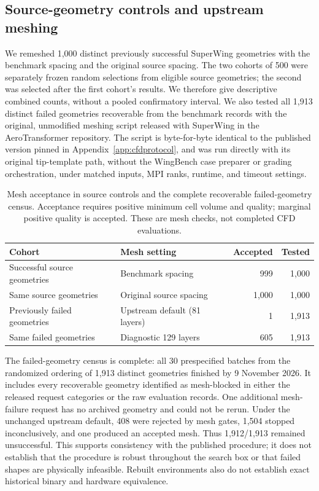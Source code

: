 \subsection{Source-geometry controls and upstream meshing}

We remeshed 1{,}000 distinct previously successful SuperWing geometries with
the benchmark spacing and the original source spacing. The two cohorts of
500 were separately frozen random selections from eligible source geometries;
the second was selected after the first cohort's results. We therefore give
descriptive combined counts, without a pooled confirmatory interval. We also
tested all 1{,}913 distinct failed geometries recoverable from the benchmark
records with the original, unmodified meshing script released with SuperWing
in the AeroTransformer repository. The script is byte-for-byte identical to
the published version pinned in Appendix~\ref{app:cfdprotocol}, and was run
directly with its original tip-template path, without the WingBench case
preparer or grading orchestration, under matched inputs, MPI ranks, runtime,
and timeout settings.

\begin{table}[htbp]
\centering\small
\caption{Mesh acceptance in source controls and the complete recoverable
failed-geometry census. Acceptance requires
positive minimum cell volume and quality; marginal positive quality is accepted.
These are mesh checks, not completed CFD evaluations.}
\label{tab:mesh-controls}
\begin{tabular}{llrr}
\toprule
Cohort & Mesh setting & Accepted & Tested \\
\midrule
Successful source geometries & Benchmark spacing & 999 & 1{,}000 \\
Same source geometries & Original source spacing & 1{,}000 & 1{,}000 \\
Previously failed geometries & Upstream default (81 layers) & 1 & 1{,}913 \\
Same failed geometries & Diagnostic 129 layers & 605 & 1{,}913 \\
\bottomrule
\end{tabular}
\end{table}

The failed-geometry census is complete: all 30 prespecified batches from the
randomized ordering of 1{,}913 distinct geometries finished by 9 November 2026.
It includes every recoverable geometry identified as mesh-blocked in either
the released request categories or the raw evaluation records. One additional
mesh-failure request has no archived geometry and could not be rerun.
Under the unchanged upstream default, 408 were rejected by mesh gates,
1{,}504 stopped inconclusively, and one produced an accepted mesh.
Thus 1{,}912/1{,}913 remained unsuccessful.
This supports consistency with the published procedure; it does not establish
that the procedure is robust throughout the search box or that failed shapes
are physically infeasible. Rebuilt environments also do not establish exact
historical binary and hardware equivalence.

